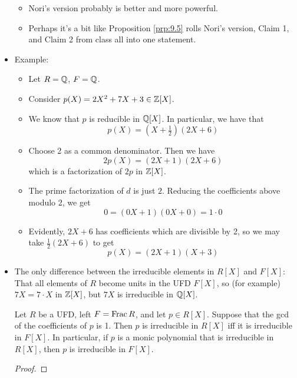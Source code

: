 \documentclass[../notes.tex]{subfiles}
\begin{document}
\begin{itemize}
\begin{itemize}
        \item Nori's version probably is better and more powerful.
        \item Perhaps it's a bit like Proposition \ref{prp:9.5} rolls Nori's version, Claim 1, and Claim 2 from class all into one statement.
    \end{itemize}
    \item Example:
    \begin{itemize}
        \item Let $R=\mathbb{Q}$, $F=\mathbb{Q}$.
        \item Consider $p(X)=2X^2+7X+3\in\mathbb{Z}[X]$.
        \item We know that $p$ is reducible in $\mathbb{Q}[X]$. In particular, we have that
        \begin{equation*}
            p(X) = (X+\tfrac{1}{2})(2X+6)
        \end{equation*}
        \item Choose 2 as a common denominator. Then we have
        \begin{equation*}
            2p(X) = (2X+1)(2X+6)
        \end{equation*}
        which is a factorization of $2p$ in $\mathbb{Z}[X]$.
        \item The prime factorization of $d$ is just $2$. Reducing the coefficients above modulo 2, we get
        \begin{equation*}
            0 = (0X+1)(0X+0) = 1\cdot 0
        \end{equation*}
        \item Evidently, $2X+6$ has coefficients which are divisible by 2, so we may take $\frac{1}{2}(2X+6)$ to get
        \begin{equation*}
            p(X) = (2X+1)(X+3)
        \end{equation*}
    \end{itemize}
    \item The only difference between the irreducible elements in $R[X]$ and $F[X]$: That all elements of $R$ become units in the UFD $F[X]$, so (for example) $7X=7\cdot X$ in $\mathbb{Z}[X]$, but $7X$ is irreducible in $\mathbb{Q}[X]$.
    \begin{corollary}\label{cly:9.6}
        Let $R$ be a UFD, left $F=\operatorname{Frac} R$, and let $p\in R[X]$. Suppose that the gcd of the coefficients of $p$ is 1. Then $p$ is irreducible in $R[X]$ iff it is irreducible in $F[X]$. In particular, if $p$ is a monic polynomial that is irreducible in $R[X]$, then $p$ is irreducible in $F[X]$.
        \begin{proof}

\end{proof}
\end{corollary}
\end{itemize}
\end{document}
